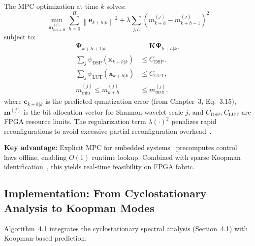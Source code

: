 The MPC optimization at time $k$ solves:
\[
\min_{\mathbf{m}^{(j)}_{k:k+H}} \sum_{h=0}^{H} \left\| \mathbf{e}_{k+h|k} \right\|^2 + \lambda \sum_{j,h} \left( m^{(j)}_{k+h} - m^{(j)}_{k+h-1} \right)^2
\]
subject to:
\begin{align}
\mathbf{\Psi}_{k+h+1|k} &= \mathbf{K} \mathbf{\Psi}_{k+h|k}, \\
\sum_{j} \psi_{\text{DSP}}(\mathbf{x}_{k+h|k}) &\leq C_{\text{DSP}}, \\
\sum_{j} \psi_{\text{LUT}}(\mathbf{x}_{k+h|k}) &\leq C_{\text{LUT}}, \\
m^{(j)}_{\min} \leq m^{(j)}_{k+h} &\leq m^{(j)}_{\max},
\end{align}
where $\mathbf{e}_{k+h|k}$ is the predicted quantization error (from Chapter~3, Eq.~3.15), $\mathbf{m}^{(j)}$ is the bit allocation vector for Shannon wavelet scale $j$, and $C_{\text{DSP}}, C_{\text{LUT}}$ are FPGA resource limits. The regularization term $\lambda(\cdot)^2$ penalizes rapid reconfigurations to avoid excessive partial reconfiguration overhead~\cite{Bhandari2012}.

\noindent\textbf{Key advantage:} Explicit MPC for embedded systems~\cite{Bemporad2002} precomputes control laws offline, enabling $O(1)$ runtime lookup. Combined with sparse Koopman identification~\cite{Kaiser2018}, this yields real-time feasibility on FPGA fabric.

\subsection{Implementation: From Cyclostationary Analysis to Koopman Modes}

Algorithm~4.1 integrates the cyclostationary spectral analysis (Section~4.1) with Koopman-based prediction:

